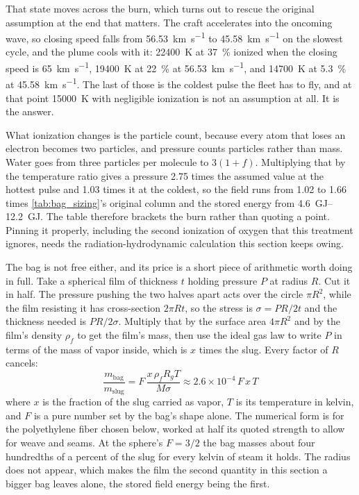 \documentclass{article}
\begin{document}
That state moves across the burn, which turns out to rescue the original assumption at the end that matters. The craft accelerates into the oncoming wave, so closing speed falls from \SI{56.53}{\kilo\meter\per\second} to \SI{45.58}{\kilo\meter\per\second} on the slowest cycle, and the plume cools with it: \SI{22400}{\kelvin} at \SI{37}{\percent} ionized when the closing speed is \SI{65}{\kilo\meter\per\second}, \SI{19400}{\kelvin} at \SI{22}{\percent} at \SI{56.53}{\kilo\meter\per\second}, and \SI{14700}{\kelvin} at \SI{5.3}{\percent} at \SI{45.58}{\kilo\meter\per\second}. The last of those is the coldest pulse the fleet has to fly, and at that point \SI{15000}{\kelvin} with negligible ionization is not an assumption at all. It is the answer.

What ionization changes is the particle count, because every atom that loses an electron becomes two particles, and pressure counts particles rather than mass. Water goes from three particles per molecule to $3(1+f)$. Multiplying that by the temperature ratio gives a pressure \num{2.75} times the assumed value at the hottest pulse and \num{1.03} times it at the coldest, so the field runs from \num{1.02} to \num{1.66} times \autoref{tab:bag_sizing}'s original column and the stored energy from \SIrange{4.6}{12.2}{\giga\joule}. The table therefore brackets the burn rather than quoting a point. Pinning it properly, including the second ionization of oxygen that this treatment ignores, needs the radiation-hydrodynamic calculation this section keeps owing.

The bag is not free either, and its price is a short piece of arithmetic worth doing in full. Take a spherical film of thickness $t$ holding pressure $P$ at radius $R$. Cut it in half. The pressure pushing the two halves apart acts over the circle $\pi R^2$, while the film resisting it has cross-section $2\pi R t$, so the stress is $\sigma = PR/2t$ and the thickness needed is $PR/2\sigma$. Multiply that by the surface area $4\pi R^2$ and by the film's density $\rho_f$ to get the film's mass, then use the ideal gas law to write $P$ in terms of the mass of vapor inside, which is $x$ times the slug. Every factor of $R$ cancels:
\begin{equation}\label{eq:bag_film_mass}
\frac{m_{\mathrm{bag}}}{m_{\mathrm{slug}}} = F\,\frac{x\,\rho_f R_g T}{M \sigma} \approx 2.6\times10^{-4}\, F\, x\, T
\end{equation}
where $x$ is the fraction of the slug carried as vapor, $T$ is its temperature in kelvin, and $F$ is a pure number set by the bag's shape alone. The numerical form is for the polyethylene fiber chosen below, worked at half its quoted strength to allow for weave and seams. At the sphere's $F = 3/2$ the bag masses about four hundredths of a percent of the slug for every kelvin of steam it holds. The radius does not appear, which makes the film the second quantity in this section a bigger bag leaves alone, the stored field energy being the first.
\end{document}
